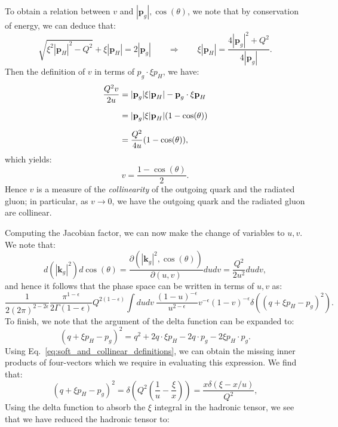 \documentclass[withindex,glossary]{cam-thesis}
\renewcommand{\vec}[1]{\textbf{#1}} %
\begin{document}
To obtain a relation between $v$ and $|\vec{p}_g|, \cos(\theta)$, we note that by conservation of energy, we can deduce that:
\begin{equation}
 \sqrt{\xi^2 |\vec{p}_H|^2 - Q^2} + \xi |\vec{p}_H| = 2 |\vec{p}_g| \qquad \Rightarrow \qquad  \xi |\vec{p}_H| = \frac{4 |\vec{p}_g|^2 + Q^2}{4|\vec{p}_g|}.
\end{equation}
Then the definition of $v$ in terms of $p_g \cdot \xi p_H$, we have:
\begin{align}
\frac{Q^2 v}{2u} &= |\vec{p}_g| \xi | \vec{p}_H| - \vec{p}_g \cdot \xi \vec{p}_H \notag\\[1.5ex]
&= |\vec{p}_g| \xi |\vec{p}_H| (1 - \cos(\theta)) \notag\\[1.5ex]
&= \frac{Q^2}{4u}(1 - \cos(\theta)),
\end{align}
which yields:
\begin{equation}
v = \frac{1 - \cos(\theta)}{2}.
\end{equation}
Hence $v$ is a measure of the \textit{collinearity} of the outgoing quark and the radiated gluon; in particular, as $v \rightarrow 0$, we have the outgoing quark and the radiated gluon are collinear.

Computing the Jacobian factor, we can now make the change of variables to $u,v$. We note that:
\begin{equation}
d(|\vec{k}_g|^2) d\cos(\theta) = \frac{\partial(|\vec{k}_g|^2, \cos(\theta))}{\partial(u,v)} du dv = \frac{Q^2}{2u^2} du dv,
\end{equation}
and hence it follows that the phase space can be written in terms of $u, v$ as:
\begin{equation}
\frac{1}{2(2\pi)^{2 - 2\epsilon}} \frac{\pi^{1-\epsilon}}{2\Gamma(1-\epsilon)} Q^{2(1-\epsilon)} \int  du dv\ \frac{(1-u)^{-\epsilon}}{u^{2-\epsilon}} v^{-\epsilon} (1-v)^{-\epsilon} \delta( (q + \xi p_H - p_g)^2).
\end{equation}
To finish, we note that the argument of the delta function can be expanded to:
\begin{equation}
(q + \xi p_H - p_g)^2 = q^2 + 2 q \cdot \xi p_H - 2 q \cdot p_g - 2 \xi p_H \cdot p_g.
\end{equation}
Using Eq.~\eqref{eq:soft_and_collinear_definitions}, we can obtain the missing inner products of four-vectors which we require in evaluating this expression. We find that:
\begin{equation}
(q + \xi p_H - p_g)^2 = \delta\left( Q^2 \left( \frac{1}{u} - \frac{\xi}{x} \right) \right) = \frac{x\delta(\xi - x/u)}{Q^2},
\end{equation}
Using the delta function to absorb the $\xi$ integral in the hadronic tensor, we see that we have reduced the hadronic tensor to:
\end{document}
